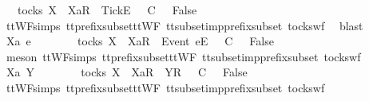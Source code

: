 \ {\isachardoublequoteopen}{\isasymsigma}\ {\isasymin}\ tocks\ X\ {\isasymLongrightarrow}\ {\isacharbrackleft}Xa{\isacharbrackright}\isactrlsub R\ {\isacharhash}\ {\isacharbrackleft}Tick{\isacharbrackright}\isactrlsub E\ {\isacharhash}\ {\isasymrho}\ {\isasymsubseteq}\isactrlsub C\ {\isasymsigma}\ {\isasymLongrightarrow}\ False{\isachardoublequoteclose}\isanewline
\ \ \ \ \isamarkupfalse%
\ ttWF{\isachardot}simps{\isacharparenleft}{}{}{\isacharparenright}\ tt{\isacharunderscore}prefix{\isacharunderscore}subset{\isacharunderscore}ttWF\ tt{\isacharunderscore}subset{\isacharunderscore}imp{\isacharunderscore}prefix{\isacharunderscore}subset\ tocks{\isacharunderscore}wf\ \isamarkupfalse%
\ blast\isanewline
{}\isamarkupfalse%
\isanewline
\ \ \isamarkupfalse%
\ Xa\ e\ {\isasymrho}\ {\isasymsigma}\isanewline
\ \ \isamarkupfalse%
\ {\isachardoublequoteopen}{\isasymsigma}\ {\isasymin}\ tocks\ X\ {\isasymLongrightarrow}\ {\isacharbrackleft}Xa{\isacharbrackright}\isactrlsub R\ {\isacharhash}\ {\isacharbrackleft}Event\ e{\isacharbrackright}\isactrlsub E\ {\isacharhash}\ {\isasymrho}\ {\isasymsubseteq}\isactrlsub C\ {\isasymsigma}\ {\isasymLongrightarrow}\ False{\isachardoublequoteclose}\isanewline
\ \ \ \ \isamarkupfalse%
\ {\isacharparenleft}meson\ ttWF{\isachardot}simps{\isacharparenleft}{}{}{\isacharparenright}\ tt{\isacharunderscore}prefix{\isacharunderscore}subset{\isacharunderscore}ttWF\ tt{\isacharunderscore}subset{\isacharunderscore}imp{\isacharunderscore}prefix{\isacharunderscore}subset\ tocks{\isacharunderscore}wf{\isacharparenright}\isanewline
{}\isamarkupfalse%
\isanewline
\ \ \isamarkupfalse%
\ Xa\ Y\ {\isasymrho}\ {\isasymsigma}\isanewline
\ \ \isamarkupfalse%
\ {\isachardoublequoteopen}{\isasymsigma}\ {\isasymin}\ tocks\ X\ {\isasymLongrightarrow}\ {\isacharbrackleft}Xa{\isacharbrackright}\isactrlsub R\ {\isacharhash}\ {\isacharbrackleft}Y{\isacharbrackright}\isactrlsub R\ {\isacharhash}\ {\isasymrho}\ {\isasymsubseteq}\isactrlsub C\ {\isasymsigma}\ {\isasymLongrightarrow}\ False{\isachardoublequoteclose}\isanewline
\ \ \ \ \isamarkupfalse%
\ ttWF{\isachardot}simps{\isacharparenleft}{}{}{\isacharparenright}\ tt{\isacharunderscore}prefix{\isacharunderscore}subset{\isacharunderscore}ttWF\ tt{\isacharunderscore}subset{\isacharunderscore}imp{\isacharunderscore}prefix{\isacharunderscore}subset\ tocks{\isacharunderscore}wf\ \isamarkupfalse%
